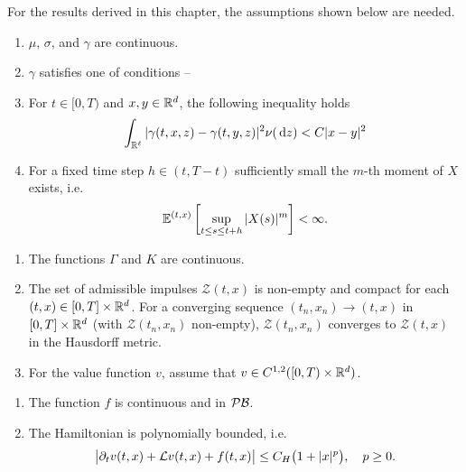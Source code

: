 For the results derived in this chapter, the assumptions shown below are needed. 
\begin{assumption}
    \label{C: Assumption S}
    \begin{enumerate}[label=(\textup{S}\arabic*), ref=(\textup{S}\arabic*)]
        \item \label{C: S1} $\mu$, $\sigma$, and $\gamma$ are continuous.
        \item \label{C: S2} $\gamma$ satisfies one of conditions -- 
        \item \label{C: S3} For $t \in [0,T)$ and $x,y \in \mathbb{R}^d$, the following inequality holds 
            \begin{align*}
                \int_{\mathbb R^\ell} |\gamma (t,x,z) - \gamma (t,y,z)|^2 \nu(\,\mathrm{d} z) < C|x-y|^2
            \end{align*}
        \item \label{C: S4} For a fixed time step $h \in (t,T-t)$ sufficiently small the $m$-th moment of $X$ exists, i.e.
        \begin{equation*}
            \mathbb{E}^{(t,x)} \left[\sup_{t \leq s \leq t+h} |X(s)|^m \right] < \infty.
        \end{equation*}
    \end{enumerate}
\end{assumption}
\begin{assumption}
    \label{C: Assumption I}
    \begin{enumerate}[label=(\textup{I}\arabic*), ref=(\textup{I}\arabic*)]
        \item \label{C: I1} The functions $\Gamma$ and $K$ are continuous.
        \item \label{C: I2} The set of admissible impulses $\mathcal{Z}(t,x)$ is non-empty and compact for each $(t,x) \in [0,T] \times \mathbb{R}^d$. For a converging sequence $(t_n,x_n) \rightarrow (t,x)$ in $[0,T] \times \mathbb{R}^d$ (with $\mathcal{Z}(t_n,x_n)$ non-empty), $\mathcal{Z}(t_n,x_n)$ converges to $\mathcal{Z}(t,x)$ in the Hausdorff metric.
        \item \label{C: I3} For the value function $v$, assume that $v \in C^{1,2}([0,T)\times \mathbb{R}^d)$. 
    \end{enumerate}
\end{assumption}
\begin{assumption}
    \label{C: Assumption H}
    \begin{enumerate}[label=(\textup{H}\arabic*), ref=(\textup{H}\arabic*)]
        \item \label{C: H1} The function $f$ is continuous and in $\mathcal{PB}$.
        \item \label{C: H2} The Hamiltonian is polynomially bounded, i.e.
        \begin{equation*}
            \big|\partial_t v(t,x) + \mathcal{L} v(t,x) + f(t,x) \big| \leq C_H\big(1+|x|^p\big), \quad p\geq 0.
        \end{equation*}
    \end{enumerate}
\end{assumption}
